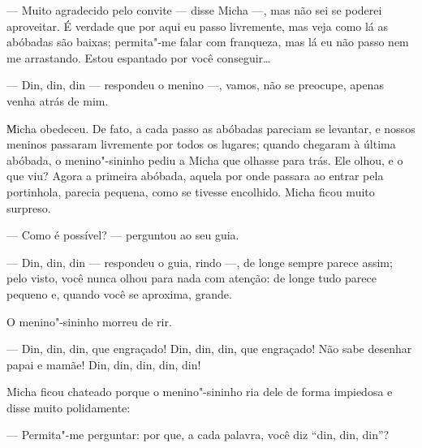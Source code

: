 --- Muito agradecido pelo convite --- disse Micha ---, mas não sei se
poderei aproveitar. É verdade que por aqui eu passo livremente, mas veja como lá as abóbadas são baixas; permita"-me falar com
franqueza, mas lá eu não passo nem me arrastando. Estou espantado por
você conseguir\ldots{}

--- Din, din, din --- respondeu o menino ---, vamos, não se preocupe,
apenas venha atrás de mim.

Мicha obedeceu. De fato, a cada passo as abóbadas pareciam se levantar,
e nossos meninos passaram livremente por todos os lugares; quando
chegaram à última abóbada, o menino"-sininho pediu a Micha que olhasse
para trás. Ele olhou, e o que viu? Agora a primeira abóbada, aquela por
onde passara ao entrar pela portinhola, parecia pequena, como se tivesse
encolhido. Micha ficou muito surpreso.

--- Como é possível? --- perguntou ao seu guia.

--- Din, din, din --- respondeu o guia, rindo ---, de longe sempre
parece assim; pelo visto, você nunca olhou para nada com atenção: de
longe tudo parece pequeno e, quando você se aproxima, grande.


O menino"-sininho morreu de rir.

--- Din, din, din, que engraçado! Din, din, din, que engraçado! Não sabe
desenhar papai e mamãe! Din, din, din, din, din!

Micha ficou chateado porque o menino"-sininho ria dele de forma impiedosa e disse muito polidamente:

--- Permita"-me perguntar: por que, a cada palavra, você diz ``din, din,
din''?

